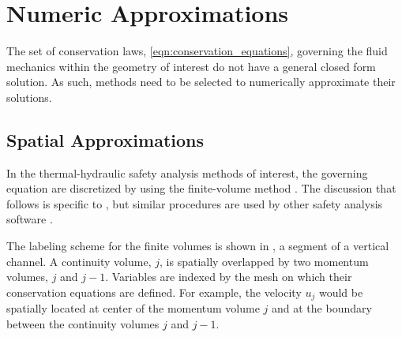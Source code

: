 \section{Numeric Approximations}
\label{sect:numeric_approximation}
The set of conservation laws, \eqref{eqn:conservation_equations}, governing the fluid mechanics within the geometry of interest do not have a general closed form solution.
As such, methods need to be selected to numerically approximate their solutions.

\subsection{Spatial Approximations}
\label{subsect:spatial_approx}
In the thermal-hydraulic safety analysis methods of interest, the governing equation are discretized by using the finite-volume method \cite{LeVeque2002}.
The discussion that follows is specific to \cobra{}, but similar procedures are used by other safety analysis software \cite{RELAP,TRACE}.

The labeling scheme for the finite volumes is shown in , a segment of a vertical channel.
A continuity volume, $j$, is spatially overlapped by two momentum volumes, $j$ and $j-1$.
Variables are indexed by the mesh on which their conservation equations are defined.
For example, the velocity $u_j$ would be spatially located at center of the momentum volume $j$ and at the boundary between the continuity volumes $j$ and $j-1$.


